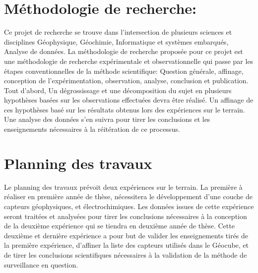 \documentclass{themeensg}
\begin{document}
\begin{appendices}
\section*{Méthodologie de recherche:}

Ce projet de recherche se trouve dans l'intersection de plusieurs sciences et disciplines Géophysique, Géochimie, Informatique et systèmes embarqués, Analyse de données. La méthodologie de recherche proposée pour ce projet est une méthodologie de recherche expérimentale et observationnelle qui passe par les étapes conventionnelles de la méthode scientifique: Question générale, affinage, conception de l'expérimentation, observation, analyse, conclusion et publication. Tout d'abord, Un dégrossissage et une décomposition du sujet en plusieurs hypothèses basées sur les observations effectuées devra être réalisé. Un affinage de ces hypothèses basé sur les résultats obtenus lors des expériences sur le terrain. Une analyse des données s'en suivra pour tirer les conclusions et les enseignements nécessaires à la réitération de ce processus.

\section*{Planning des travaux}

Le planning des travaux prévoit deux expériences sur le terrain. La première à réaliser en première année de thèse, nécessitera le développement d'une couche de capteurs géophysiques, et électrochimiques. Les données issues de cette expérience seront traitées et analysées pour tirer les conclusions nécessaires à la conception de la deuxième expérience qui se tiendra en deuxième année de thèse. Cette deuxième et dernière expérience a pour but de valider les enseignements tirés de la première expérience, d'affiner la liste des capteurs utilisés dans le Géocube, et de tirer les conclusions scientifiques nécessaires à la validation de la méthode de surveillance en question.



\end{appendices} 
\end{document}
